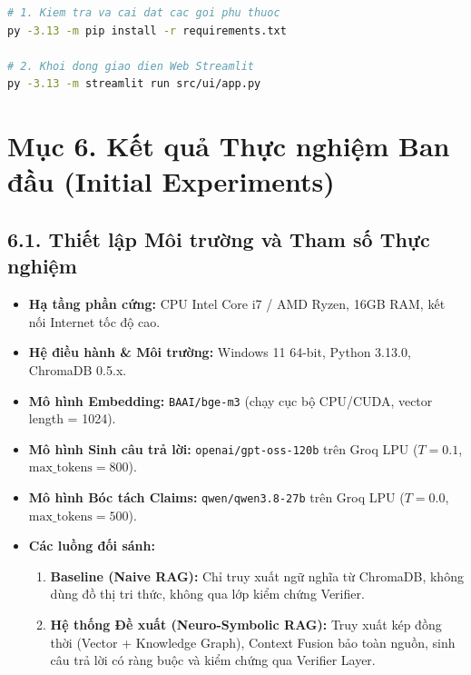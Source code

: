 \documentclass[a4paper,12pt]{article}
\begin{document}
\begin{lstlisting}[language=bash, caption={Lệnh khởi chạy ứng dụng Web UI trên Terminal}]
# 1. Kiem tra va cai dat cac goi phu thuoc
py -3.13 -m pip install -r requirements.txt

# 2. Khoi dong giao dien Web Streamlit
py -3.13 -m streamlit run src/ui/app.py
\end{lstlisting}

\section{Mục 6. Kết quả Thực nghiệm Ban đầu (Initial Experiments)}

\subsection{6.1. Thiết lập Môi trường và Tham số Thực nghiệm}
\begin{itemize}[noitemsep]
    \item \textbf{Hạ tầng phần cứng:} CPU Intel Core i7 / AMD Ryzen, 16GB RAM, kết nối Internet tốc độ cao.
    \item \textbf{Hệ điều hành \& Môi trường:} Windows 11 64-bit, Python 3.13.0, ChromaDB 0.5.x.
    \item \textbf{Mô hình Embedding:} \texttt{BAAI/bge-m3} (chạy cục bộ CPU/CUDA, vector length = 1024).
    \item \textbf{Mô hình Sinh câu trả lời:} \texttt{openai/gpt-oss-120b} trên Groq LPU ($T=0.1$, $\text{max\_tokens}=800$).
    \item \textbf{Mô hình Bóc tách Claims:} \texttt{qwen/qwen3.8-27b} trên Groq LPU ($T=0.0$, $\text{max\_tokens}=500$).
    \item \textbf{Các luồng đối sánh:}
    \begin{enumerate}[noitemsep]
        \item \textbf{Baseline (Naive RAG):} Chỉ truy xuất ngữ nghĩa từ ChromaDB, không dùng đồ thị tri thức, không qua lớp kiểm chứng Verifier.
        \item \textbf{Hệ thống Đề xuất (Neuro-Symbolic RAG):} Truy xuất kép đồng thời (Vector + Knowledge Graph), Context Fusion bảo toàn nguồn, sinh câu trả lời có ràng buộc và kiểm chứng qua Verifier Layer.
    \end{enumerate}
\end{itemize}
\end{document}
